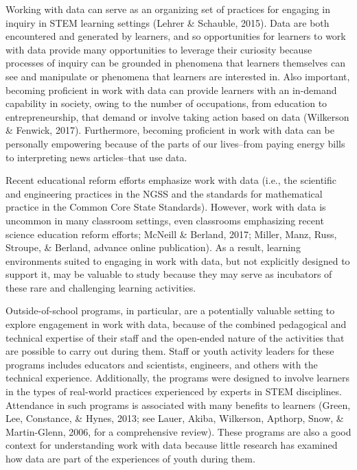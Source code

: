 \documentclass[]{msu-thesis}
\theoremstyle{definition}
\theoremstyle{definition}
\theoremstyle{definition}
\theoremstyle{remark}
\begin{document}
Working with data can serve as an organizing set of practices for
engaging in inquiry in STEM learning settings (Lehrer \& Schauble,
2015). Data are both encountered and generated by learners, and so
opportunities for learners to work with data provide many opportunities
to leverage their curiosity because processes of inquiry can be grounded
in phenomena that learners themselves can see and manipulate or
phenomena that learners are interested in. Also important, becoming
proficient in work with data can provide learners with an in-demand
capability in society, owing to the number of occupations, from
education to entrepreneurship, that demand or involve taking action
based on data (Wilkerson \& Fenwick, 2017). Furthermore, becoming
proficient in work with data can be personally empowering because of the
parts of our lives--from paying energy bills to interpreting news
articles--that use data.

Recent educational reform efforts emphasize work with data (i.e., the
scientific and engineering practices in the NGSS and the standards for
mathematical practice in the Common Core State Standards). However, work
with data is uncommon in many classroom settings, even classrooms
emphasizing recent science education reform efforts; McNeill \& Berland,
2017; Miller, Manz, Russ, Stroupe, \& Berland, advance online
publication). As a result, learning environments suited to engaging in
work with data, but not explicitly designed to support it, may be
valuable to study because they may serve as incubators of these rare and
challenging learning activities.

Outside-of-school programs, in particular, are a potentially valuable
setting to explore engagement in work with data, because of the combined
pedagogical and technical expertise of their staff and the open-ended
nature of the activities that are possible to carry out during them.
Staff or youth activity leaders for these programs includes educators
and scientists, engineers, and others with the technical experience.
Additionally, the programs were designed to involve learners in the
types of real-world practices experienced by experts in STEM
disciplines. Attendance in such programs is associated with many
benefits to learners (Green, Lee, Constance, \& Hynes, 2013; see Lauer,
Akiba, Wilkerson, Apthorp, Snow, \& Martin-Glenn, 2006, for a
comprehensive review). These programs are also a good context for
understanding work with data because little research has examined how
data are part of the experiences of youth during them.
\end{document}
